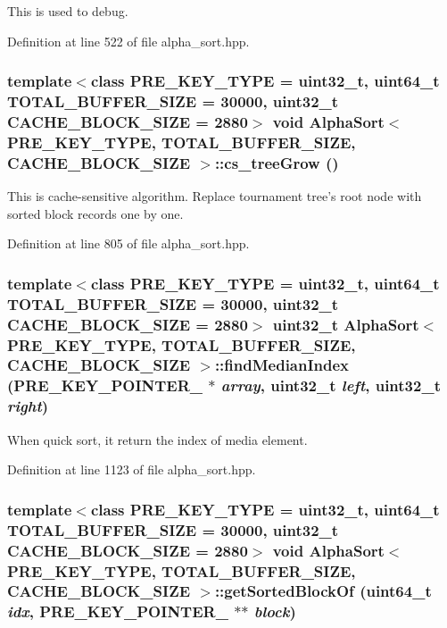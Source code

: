 This is used to debug. 

Definition at line 522 of file alpha\_\-sort.hpp.\hypertarget{classAlphaSort_035df8c7933e6e714ec785f8277f5997}{
\subsubsection[{cs\_\-treeGrow}]{\setlength{\rightskip}{0pt plus 5cm}template$<$class PRE\_\-KEY\_\-TYPE  = uint32\_\-t, uint64\_\-t TOTAL\_\-BUFFER\_\-SIZE = 30000, uint32\_\-t CACHE\_\-BLOCK\_\-SIZE = 2880$>$ void {\bf AlphaSort}$<$ PRE\_\-KEY\_\-TYPE, TOTAL\_\-BUFFER\_\-SIZE, CACHE\_\-BLOCK\_\-SIZE $>$::cs\_\-treeGrow ()}}
\label{classAlphaSort_035df8c7933e6e714ec785f8277f5997}


This is cache-sensitive algorithm. Replace tournament tree's root node with sorted block records one by one. 

Definition at line 805 of file alpha\_\-sort.hpp.\hypertarget{classAlphaSort_97f87789bee65985b3078714ebb150f6}{
\subsubsection[{findMedianIndex}]{\setlength{\rightskip}{0pt plus 5cm}template$<$class PRE\_\-KEY\_\-TYPE  = uint32\_\-t, uint64\_\-t TOTAL\_\-BUFFER\_\-SIZE = 30000, uint32\_\-t CACHE\_\-BLOCK\_\-SIZE = 2880$>$ uint32\_\-t {\bf AlphaSort}$<$ PRE\_\-KEY\_\-TYPE, TOTAL\_\-BUFFER\_\-SIZE, CACHE\_\-BLOCK\_\-SIZE $>$::findMedianIndex (PRE\_\-KEY\_\-POINTER\_\- $\ast$ {\em array}, \/  uint32\_\-t {\em left}, \/  uint32\_\-t {\em right})}}
\label{classAlphaSort_97f87789bee65985b3078714ebb150f6}


When quick sort, it return the index of media element. 

Definition at line 1123 of file alpha\_\-sort.hpp.\hypertarget{classAlphaSort_569e4b78cb9a67016585bb2d866daf55}{
\subsubsection[{getSortedBlockOf}]{\setlength{\rightskip}{0pt plus 5cm}template$<$class PRE\_\-KEY\_\-TYPE  = uint32\_\-t, uint64\_\-t TOTAL\_\-BUFFER\_\-SIZE = 30000, uint32\_\-t CACHE\_\-BLOCK\_\-SIZE = 2880$>$ void {\bf AlphaSort}$<$ PRE\_\-KEY\_\-TYPE, TOTAL\_\-BUFFER\_\-SIZE, CACHE\_\-BLOCK\_\-SIZE $>$::getSortedBlockOf (uint64\_\-t {\em idx}, \/  PRE\_\-KEY\_\-POINTER\_\- $\ast$$\ast$ {\em block})}}
\label{classAlphaSort_569e4b78cb9a67016585bb2d866daf55}



